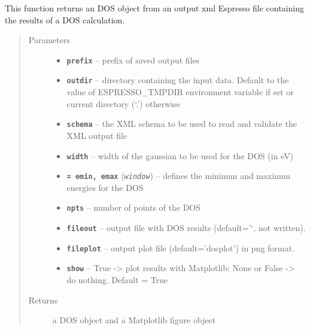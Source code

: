 \documentclass[letterpaper,10pt,english]{sphinxmanual}
\begin{document}
\begin{fulllineitems}
\label{postqe:postqe.api.comput_dos}
This function returns an DOS object from an output xml Espresso file containing the
results of a DOS calculation.
\begin{quote}\begin{description}
\item[{Parameters}] \leavevmode\begin{itemize}
\item {} 
\textbf{\texttt{prefix}} -- prefix of saved output files

\item {} 
\textbf{\texttt{outdir}} -- directory containing the input data. Default to the value of
ESPRESSO\_TMPDIR environment variable if set or current directory (`.') otherwise

\item {} 
\textbf{\texttt{schema}} -- the XML schema to be used to read and validate the XML output file

\item {} 
\textbf{\texttt{width}} -- width of the gaussian to be used for the DOS (in eV)

\item {} 
\textbf{\texttt{= emin, emax}} (\emph{\texttt{window}}) -- defines the minimun and maximun energies for the DOS

\item {} 
\textbf{\texttt{npts}} -- number of points of the DOS

\item {} 
\textbf{\texttt{fileout}} -- output file with DOS results (default='`, not written).

\item {} 
\textbf{\texttt{fileplot}} -- output plot file (default='dosplot') in png format.

\item {} 
\textbf{\texttt{show}} -- True -\textgreater{} plot results with Matplotlib; None or False -\textgreater{} do nothing. Default = True

\end{itemize}

\item[{Returns}] \leavevmode
a DOS object and a Matplotlib figure object

\end{description}\end{quote}

\end{fulllineitems}
\end{document}

